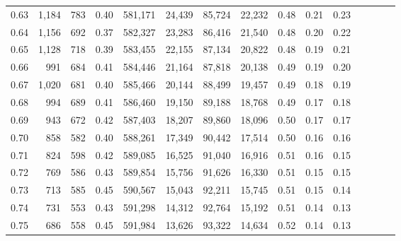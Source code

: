 \begin{tabular}{rrrcrrrrrrrrrrr}
0.63 &   1,184 &    783 &                                       0.40 &  581,171 &   24,439 &   85,724 &   22,232 &  0.48 &  0.21 &                         0.23 \\
0.64 &   1,156 &    692 &                                       0.37 &  582,327 &   23,283 &   86,416 &   21,540 &  0.48 &  0.20 &                         0.22 \\
0.65 &   1,128 &    718 &                                       0.39 &  583,455 &   22,155 &   87,134 &   20,822 &  0.48 &  0.19 &                         0.21 \\
0.66 &     991 &    684 &                                       0.41 &  584,446 &   21,164 &   87,818 &   20,138 &  0.49 &  0.19 &                         0.20 \\
0.67 &   1,020 &    681 &                                       0.40 &  585,466 &   20,144 &   88,499 &   19,457 &  0.49 &  0.18 &                         0.19 \\
0.68 &     994 &    689 &                                       0.41 &  586,460 &   19,150 &   89,188 &   18,768 &  0.49 &  0.17 &                         0.18 \\
0.69 &     943 &    672 &                                       0.42 &  587,403 &   18,207 &   89,860 &   18,096 &  0.50 &  0.17 &                         0.17 \\
0.70 &     858 &    582 &                                       0.40 &  588,261 &   17,349 &   90,442 &   17,514 &  0.50 &  0.16 &                         0.16 \\
0.71 &     824 &    598 &                                       0.42 &  589,085 &   16,525 &   91,040 &   16,916 &  0.51 &  0.16 &                         0.15 \\
0.72 &     769 &    586 &                                       0.43 &  589,854 &   15,756 &   91,626 &   16,330 &  0.51 &  0.15 &                         0.15 \\
0.73 &     713 &    585 &                                       0.45 &  590,567 &   15,043 &   92,211 &   15,745 &  0.51 &  0.15 &                         0.14 \\
0.74 &     731 &    553 &                                       0.43 &  591,298 &   14,312 &   92,764 &   15,192 &  0.51 &  0.14 &                         0.13 \\
0.75 &     686 &    558 &                                       0.45 &  591,984 &   13,626 &   93,322 &   14,634 &  0.52 &  0.14 &                         0.13 \\

\end{tabular}
